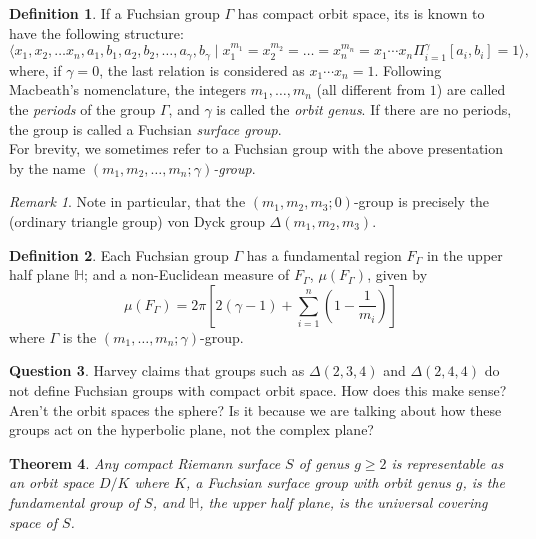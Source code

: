 \documentclass[reqno]{amsart}
\newtheorem{theorem}{Theorem}[section]
\theoremstyle{definition}
\newtheorem{definition}[theorem]{Definition}
\newtheorem{question}[theorem]{Question}
\theoremstyle{remark}
\newtheorem*{remark}{Remark}
\begin{document}
\begin{definition}\label{fuchsian-group-presentation}
    If a Fuchsian group $\Gamma$ has compact orbit space,
    its is known to have the following structure:
    \[
    \langle x_1, x_2, \ldots x_n, a_1, b_1, a_2, b_2 ,\ldots,
    a_{\gamma} , b_{\gamma} \mid 
    x_1^{m_1} = x_2^{m_2} = \ldots = x_n^{m_n} =
    x_1 \cdots x_n \Pi_{i=1}^{\gamma} \left[a_i, b_i \right] =1 \rangle,
    \]
    where, if $\gamma = 0$, the last relation
    is considered as $x_1 \cdots x_n = 1$.
    Following Macbeath's nomenclature, the integers
    $m_1, \ldots, m_n$ (all different from $1$) are called the
    \textit{periods} of the group $\Gamma$, and
    $\gamma$ is called the \textit{orbit genus}. If there
    are no periods, the group is called a Fuchsian \textit{surface group}.\\
    For brevity, we sometimes refer to a Fuchsian group with
    the above presentation by the name
    $(m_1, m_2, \ldots, m_n ; \gamma)$\textit{-group}.
\end{definition}

\begin{remark}
    Note in particular, that the
    $(m_1, m_2, m_3;0)$-group is
    precisely the (ordinary triangle group) von Dyck group $\Delta(m_1, m_2,m_3)$.
\end{remark}

\begin{definition}
    Each Fuchsian group $\Gamma$ has
    a fundamental region $F_{\Gamma}$
    in the upper half plane
    $\mathbb{H}$; and a non-Euclidean
    measure of $F_{\Gamma}$, $\mu (F_{\Gamma})$, given by
    \[\mu (F_{\Gamma}) =
    2 \pi \left[ 2 (\gamma -1)
    + \sum_{i=1}^n \left(1-\frac{1}{m_i}
    \right) \right] \]
    where $\Gamma$ is the
    $(m_1, \ldots, m_n; \gamma)$-group.
\end{definition}

\begin{question}
    Harvey claims that groups
    such as $\Delta(2,3,4)$ and
    $\Delta(2,4,4)$ do not
    define Fuchsian groups with
    compact orbit space. How does this make sense? Aren't the orbit spaces the sphere?
    Is it because we are talking
    about how these groups act
    on the hyperbolic plane, not 
    the complex plane?
\end{question}

\begin{theorem}
    Any compact Riemann surface
    $S$ of genus $g \geq 2$
    is representable as an orbit
    space $D/K$ where $K$,
    a Fuchsian surface group with orbit genus $g$,
    is the fundamental group of
    $S$, and $\mathbb{H}$, the upper half plane, is the universal covering space of $S$.
\end{theorem}
\end{document}
